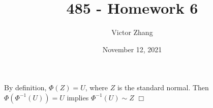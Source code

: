 \documentclass{article}
\title{485 - Homework 6}
\author{Victor Zhang}
\date{November 12, 2021}
\begin{document}
\maketitle

\section{}
\subsection{}
By definition, $\Phi(Z) = U$, where $Z$ is the standard normal. Then $\Phi(\Phi^{-1}(U)) = U$ implies $\Phi^{-1}(U) \sim Z$ $\Box$
\end{document}
